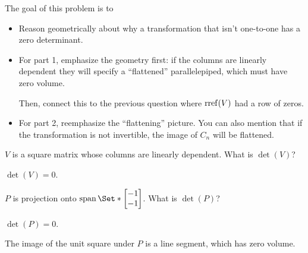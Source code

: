 \documentclass{workbook}
\newcommand{\bookonlynewpage}{\begin{bookonly}\newpage\end{bookonly}}
\begin{document}
\begin{slide}
	\bookonlynewpage
	\question
	\begin{annotation}
		\begin{goals}

			The goal of this problem is to
			\begin{itemize}
				\item Reason geometrically about why a transformation that isn't one-to-one
					has a zero determinant.
			\end{itemize}
		\end{goals}

		\begin{notes}
			\begin{itemize}
				\item For part 1, emphasize the geometry first: if
					the columns are linearly dependent they will
					specify a ``flattened'' parallelepiped, which must have zero volume.

					Then, connect this to the previous question where $\operatorname{rref}(V)$ had a row of zeros.
				\item For part 2, reemphasize the ``flattening'' picture. You can also mention
					that if the transformation is not invertible, the image of $C_n$ will
					be flattened.
			\end{itemize}
		\end{notes}
	\end{annotation}
	\begin{parts}
		\item $V$ is a square matrix whose columns are linearly dependent.
			What is $\det(V)$?
			\begin{solution}
				$\det(V)=0$.
			\end{solution}
		\item $P$ is projection onto $\Span\Set*{\mat{-1\\-1}}$. What is $\det(P)$?
			\begin{solution}
				$\det(P)=0$.

				The image of the unit square under $P$ is a line segment, which
				has zero volume.
			\end{solution}
	\end{parts}
\end{slide}
\end{document}
